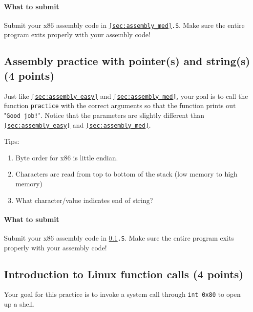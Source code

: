 \documentclass[letterpaper,12pt]{report}
\begin{document}
{ \paragraph{What to submit}
Submit your x86 assembly code in \texttt{\ref{sec:assembly_med}.S}. Make sure the entire program exits properly with your assembly code!


\subsection{Assembly practice with pointer(s) and string(s) (4 points) }
\label{sec:assembly_hard}
Just like \texttt{\ref{sec:assembly_easy}} and \texttt{\ref{sec:assembly_med}}, your goal is to call the function \texttt{practice} with the correct arguments so that the function prints out "\texttt{Good job!}". Notice that the parameters are slightly different than \texttt{\ref{sec:assembly_easy}} and \texttt{\ref{sec:assembly_med}}.

\smallskip

Tips:
\begin{enumerate}
\item Byte order for x86 is little endian.
\item Characters are read from top to bottom of the stack (low memory to high memory)
\item What character/value indicates end of string?
\end{enumerate}

 \paragraph{What to submit}
Submit your x86 assembly code in \texttt{\ref{sec:assembly_hard}.S}. Make sure the entire program exits properly with your assembly code!

\subsection{Introduction to Linux function calls (4 points) }
\label{sec:sys_call}

Your goal for this practice is to invoke a system call through \texttt{int 0x80} to open up a shell.

\smallskip

}
\end{document}
